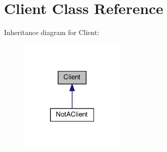 \hypertarget{class_client}{}\section{Client Class Reference}
\label{class_client}


Inheritance diagram for Client\+:\nopagebreak
\begin{figure}[H]
\begin{center}
\leavevmode
\includegraphics[width=145pt]{class_client__inherit__graph}
\end{center}
\end{figure}
